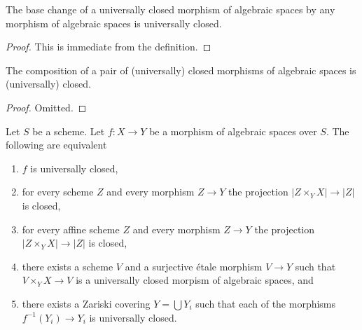 \begin{lemma}
\label{lemma-base-change-universally-closed}
The base change of a universally closed morphism of algebraic spaces
by any morphism of algebraic spaces is universally closed.
\end{lemma}

\begin{proof}
This is immediate from the definition.
\end{proof}

\begin{lemma}
\label{lemma-composition-universally-closed}
The composition of a pair of (universally) closed morphisms of algebraic spaces
is (universally) closed.
\end{lemma}

\begin{proof}
Omitted.
\end{proof}

\begin{lemma}
\label{lemma-universally-closed-local}
Let $S$ be a scheme. Let $f : X \to Y$ be a morphism of algebraic spaces
over $S$. The following are equivalent
\begin{enumerate}
\item $f$ is universally closed,
\item for every scheme $Z$ and every morphism $Z \to Y$
the projection $|Z \times_Y X| \to |Z|$ is closed,
\item for every affine scheme $Z$ and every morphism $Z \to Y$
the projection $|Z \times_Y X| \to |Z|$ is closed,
\item there exists a scheme $V$ and a surjective \'etale morphism
$V \to Y$ such that $V \times_Y X \to V$ is a universally closed morpism
of algebraic spaces, and
\item there exists a Zariski covering $Y = \bigcup Y_i$ such that
each of the morphisms $f^{-1}(Y_i) \to Y_i$ is universally closed.
\end{enumerate}
\end{lemma}

